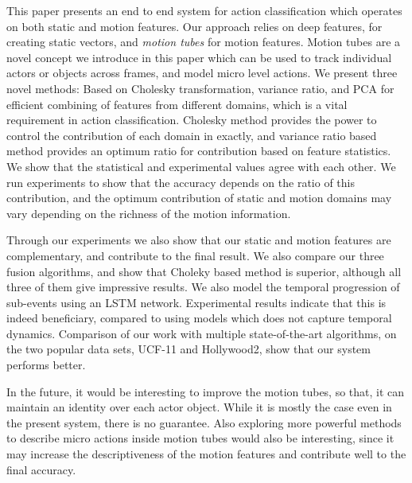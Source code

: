 This paper presents an end to end system for action classification which operates
on both static and motion features. Our approach relies on deep features,
for creating static vectors, and \textit{motion tubes} for motion features.
Motion tubes are a novel concept we introduce in this paper which can be
used to track individual actors or objects across frames, and model micro level actions.
We present three novel methods: Based on Cholesky transformation, variance ratio, and PCA for efficient combining of features
from different domains, which is a vital requirement in action classification.
Cholesky method provides the power to control the contribution of each domain in exactly, and
variance ratio based method  provides an optimum ratio for contribution based on feature statistics. We show that the statistical
and experimental values agree with each other. We run experiments to show that the accuracy depends on the ratio of this contribution, and the optimum contribution of
static and motion domains may vary depending on the richness of the motion information.

Through our experiments we also show that our static and motion features are complementary,
and contribute to the final result. We also compare our three fusion algorithms, and
show that Choleky based method is superior, although all three of them give impressive results. We also model the temporal progression of sub-events using an LSTM network. Experimental
results indicate that this is indeed beneficiary, compared to using models which does not capture temporal dynamics. Comparison of our work with multiple state-of-the-art algorithms, on the two popular data sets, UCF-11 and Hollywood2, show that our system performs better.


In the future, it would be interesting to improve the motion tubes, so that, it can maintain an identity over each actor object.
While it is mostly the case even in the present system, there is no guarantee.
Also exploring more powerful methods to describe micro actions inside motion tubes would also be interesting, since it may increase the descriptiveness of the motion features and
contribute well to the final accuracy.
